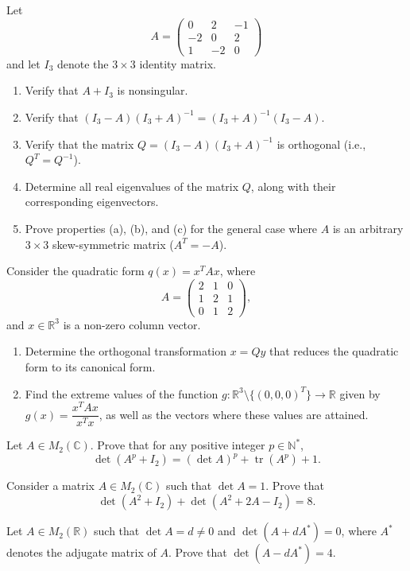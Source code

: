\documentclass[12pt]{article}
\begin{document}
\begin{problems}
\item Let
\[
A=\begin{pmatrix} 0 & 2 & -1\\ -2 & 0 & 2\\ 1 & -2 & 0\end{pmatrix}
\]
and let $I_3$ denote the $3\times 3$ identity matrix.
\begin{enumerate}[label=(\alph*)]
\item Verify that $A+I_3$ is nonsingular.
\item Verify that $(I_3-A)(I_3+A)^{-1} = (I_3+A)^{-1}(I_3-A)$.
\item Verify that the matrix $Q=(I_3-A)(I_3+A)^{-1}$ is orthogonal (i.e., $Q^T=Q^{-1}$).
\item Determine all real eigenvalues of the matrix $Q$, along with their corresponding eigenvectors.
\item Prove properties (a), (b), and (c) for the general case where $A$ is an arbitrary $3\times 3$ skew-symmetric matrix ($A^T=-A$).
\end{enumerate}

\item Consider the quadratic form $q(x)=x^TAx$, where
\[
A=\begin{pmatrix} 2 & 1 & 0\\ 1 & 2 & 1\\ 0 & 1 & 2\end{pmatrix},
\]
and $x\in\mathbb{R}^3$ is a non-zero column vector.
\begin{enumerate}[label=(\alph*)]
\item Determine the orthogonal transformation $x=Qy$ that reduces the quadratic form to its canonical form.
\item Find the extreme values of the function $g:\mathbb{R}^3\setminus\{(0,0,0)^T\}\to\mathbb{R}$ given by $g(x)=\dfrac{x^TAx}{x^Tx}$, as well as the vectors where these values are attained.
\end{enumerate}

\item Let $A\in M_2(\mathbb{C})$. Prove that for any positive integer $p\in\mathbb{N}^*$,
\[
\det(A^p+I_2) = (\det A)^p + \operatorname{tr}(A^p) + 1.
\]

\item Consider a matrix $A\in M_2(\mathbb{C})$ such that $\det A=1$. Prove that
\[
\det(A^2+I_2) + \det(A^2+2A-I_2) = 8.
\]

\item Let $A\in M_2(\mathbb{R})$ such that $\det A = d\ne 0$ and $\det(A+dA^*)=0$, where $A^*$ denotes the adjugate matrix of $A$. Prove that $\det(A-dA^*)=4$.


\end{problems}
\end{document}
